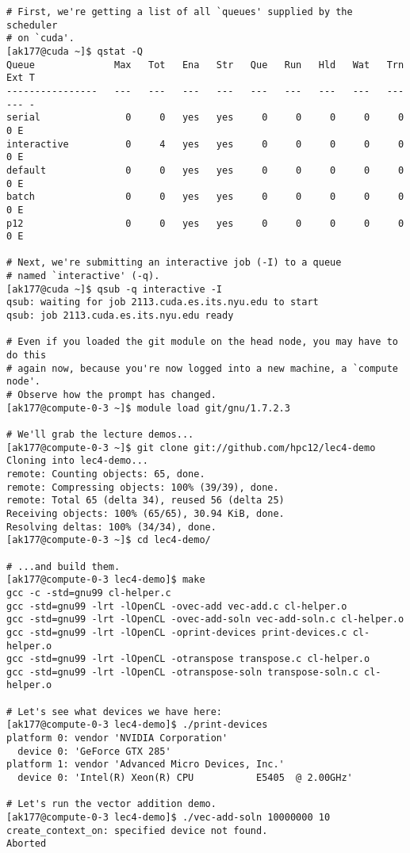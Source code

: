 \documentclass[11pt]{article}
\begin{document}
\begin{lstlisting}
# First, we're getting a list of all `queues' supplied by the scheduler
# on `cuda'.
[ak177@cuda ~]$ qstat -Q
Queue              Max   Tot   Ena   Str   Que   Run   Hld   Wat   Trn   Ext T
----------------   ---   ---   ---   ---   ---   ---   ---   ---   ---   --- -
serial               0     0   yes   yes     0     0     0     0     0     0 E
interactive          0     4   yes   yes     0     0     0     0     0     0 E
default              0     0   yes   yes     0     0     0     0     0     0 E
batch                0     0   yes   yes     0     0     0     0     0     0 E
p12                  0     0   yes   yes     0     0     0     0     0     0 E

# Next, we're submitting an interactive job (-I) to a queue
# named `interactive' (-q).
[ak177@cuda ~]$ qsub -q interactive -I
qsub: waiting for job 2113.cuda.es.its.nyu.edu to start
qsub: job 2113.cuda.es.its.nyu.edu ready

# Even if you loaded the git module on the head node, you may have to do this
# again now, because you're now logged into a new machine, a `compute node'.
# Observe how the prompt has changed.
[ak177@compute-0-3 ~]$ module load git/gnu/1.7.2.3

# We'll grab the lecture demos...
[ak177@compute-0-3 ~]$ git clone git://github.com/hpc12/lec4-demo
Cloning into lec4-demo...
remote: Counting objects: 65, done.
remote: Compressing objects: 100% (39/39), done.
remote: Total 65 (delta 34), reused 56 (delta 25)
Receiving objects: 100% (65/65), 30.94 KiB, done.
Resolving deltas: 100% (34/34), done.
[ak177@compute-0-3 ~]$ cd lec4-demo/

# ...and build them.
[ak177@compute-0-3 lec4-demo]$ make
gcc -c -std=gnu99 cl-helper.c
gcc -std=gnu99 -lrt -lOpenCL -ovec-add vec-add.c cl-helper.o
gcc -std=gnu99 -lrt -lOpenCL -ovec-add-soln vec-add-soln.c cl-helper.o
gcc -std=gnu99 -lrt -lOpenCL -oprint-devices print-devices.c cl-helper.o
gcc -std=gnu99 -lrt -lOpenCL -otranspose transpose.c cl-helper.o
gcc -std=gnu99 -lrt -lOpenCL -otranspose-soln transpose-soln.c cl-helper.o

# Let's see what devices we have here:
[ak177@compute-0-3 lec4-demo]$ ./print-devices
platform 0: vendor 'NVIDIA Corporation'
  device 0: 'GeForce GTX 285'
platform 1: vendor 'Advanced Micro Devices, Inc.'
  device 0: 'Intel(R) Xeon(R) CPU           E5405  @ 2.00GHz'

# Let's run the vector addition demo.
[ak177@compute-0-3 lec4-demo]$ ./vec-add-soln 10000000 10
create_context_on: specified device not found.
Aborted


\end{lstlisting}
\end{document}
